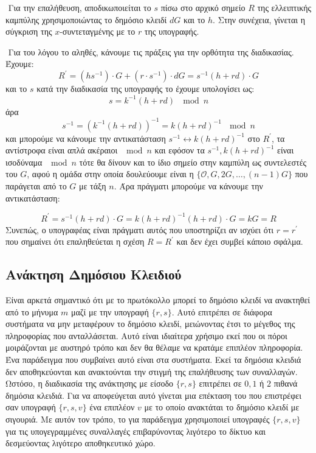 \documentclass[oneside,a4paper]{article}
\begin{document}
$ $\newline
Για την επαλήθευση, αποδικωποιείται το $s$ πίσω στο αρχικό σημείο $R$ της ελλειπτικής καμπύλης χρησιμοποιώντας το δημόσιο κλειδί $dG$ και το  $h$. Στην συνέχεια, γίνεται η σύγκριση της $x$-συντεταγμένης με το $r$ της υπογραφής.

$ $\newline
Για του λόγου το αληθές, κάνουμε τις πράξεις για την ορθότητα της διαδικασίας. Έχουμε:
$$R^{\prime} = (h s^{-1})\cdot G + (r\cdot s^{-1})\cdot dG = s^{-1}(h+rd)\cdot G$$
και το $s$ κατά την διαδικασία της υπογραφής το έχουμε υπολογίσει ως:
$$s = k^{-1}(h+rd) \ \mod n$$ άρα
$$s^{-1} = (k^{-1}(h+rd))^{-1} = k(h+rd)^{-1} \ \mod n$$ και μπορούμε να κάνουμε την αντικατάσταση $s^{-1} \leftrightarrow k(h+rd)^{-1}$ στο $R^{\prime}$, τα αντίστροφα είναι απλά ακέραιοι $\mod n$ και εφόσον τα $s^{-1}, k(h+rd)^{-1}$ είναι ισοδύναμα $\mod n$ τότε θα δίνουν και το ίδιο σημείο στην καμπύλη ως συντελεστές του $G$, αφού η ομάδα στην οποία δουλεύουμε είναι η $\{\mathcal{O},G,2G,\ldots,(n-1)G\}$ που παράγεται από το $G$ με τάξη $n$. Άρα πράγματι μπορούμε να κάνουμε την αντικατάσταση:

$$R^{\prime} = s^{-1}(h+rd) \cdot G = k(h+rd)^{-1}(h+rd) \cdot G = kG = R$$ Συνεπώς, ο υπογραφέας είναι πράγματι αυτός που υποστηρίζει αν ισχύει ότι $r=r^{\prime}$ που σημαίνει ότι επαληθεύεται η σχέση $R=R^{\prime}$ και δεν έχει συμβεί κάποιο σφάλμα.

\vspace*{0.3cm}
\subsection{Ανάκτηση Δημόσιου Κλειδιού}

\vspace*{0.3cm}
\noindent Είναι αρκετά σημαντικό ότι με το πρωτόκολλο  μπορεί το δημόσιο κλειδί να ανακτηθεί από το μήνυμα $m$ μαζί με την υπογραφή $\{r,s\}$. Αυτό επιτρέπει σε διάφορα συστήματα να μην μεταφέρουν το δημόσιο κλειδί, μειώνοντας έτσι το μέγεθος της πληροφορίας που ανταλλάσεται. Αυτό είναι ιδιαίτερα χρήσιμο εκεί που οι πόροι μοιράζονται με αυστηρό τρόπο και δεν θα θέλαμε να κρατάμε επιπλέον πληροφορία. Ένα παράδειγμα που συμβαίνει αυτό είναι στα  συστήματα. Εκεί τα δημόσια κλειδιά δεν αποθηκεύονται και ανακτούνται την στιγμή της επαλήθευσης των συναλλαγών. Ωστόσο, η διαδικασία της ανάκτησης με είσοδο $\{r,s\}$ επιτρέπει σε $0,1$ ή $2$ πιθανά δημόσια κλειδιά. Για να αποφεύγεται αυτό γίνεται μια επέκταση του  που επιστρέφει σαν υπογραφή $\{r,s,v\}$ ένα επιπλέον  $v$ με το οποίο ανακτάται το δημόσιο κλειδί με σιγουριά. Με αυτόν τον τρόπο, το  για παράδειγμα χρησιμοποιεί υπογραφές $\{r,s,v\}$ για τις υπογεγραμμένες συναλλαγές επιβαρύνοντας λιγότερο το δίκτυο και δεσμεύοντας λιγότερο αποθηκευτικό χώρο. 
\end{document}
